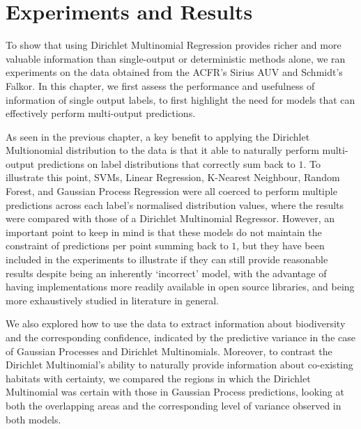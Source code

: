 \makeatletter[H]
\renewcommand{\fnum@figure}{Figure \thefigure}
\makeatother

\chapter{Experiments and Results} \label{chap:experiments}

To show that using Dirichlet Multinomial Regression provides richer and more valuable information than single-output or deterministic methods alone, we ran experiments on the data obtained from the ACFR's Sirius AUV and Schmidt's Falkor. In this chapter, we first assess the performance and usefulness of information of single output labels, to first highlight the need for models that can effectively perform multi-output predictions.

As seen in the previous chapter, a key benefit to applying the Dirichlet Multionomial distribution to the data is that it able to naturally perform multi-output predictions on label distributions that correctly sum back to $1$. To illustrate this point, SVMs, Linear Regression, K-Nearest Neighbour, Random Forest, and Gaussian Process Regression were all coerced to perform multiple predictions across each label's normalised distribution values, where the results were compared with those of a Dirichlet Multinomial Regressor. However, an important point to keep in mind is that these models do not maintain the constraint of predictions per point summing back to $1$, but they have been included in the experiments to illustrate if they can still provide reasonable results despite being an inherently `incorrect' model, with the advantage of having implementations more readily available in open source libraries, and being more exhaustively studied in literature in general.

We also explored how to use the data to extract information about biodiversity and the corresponding confidence, indicated by the predictive variance in the case of Gaussian Processes and Dirichlet Multinomials. Moreover, to contrast the Dirichlet Multinomial's ability to naturally provide information about co-existing habitats with certainty, we compared the regions in which the Dirichlet Multinomial was certain with those in Gaussian Process predictions, looking at both the overlapping areas and the corresponding level of variance observed in both models.

